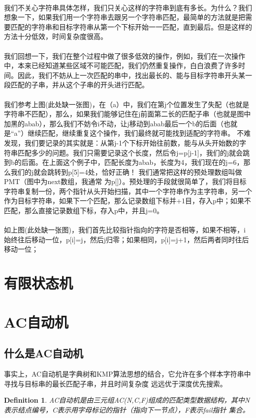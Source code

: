 \documentclass[12pt,a4paper,UTF16]{ctexbook}
\theoremstyle{plain}
\newtheorem{definition}{\indent Definition}[section]
\begin{document}
\paragraph{}我们不关心字符串具体怎样，我们只关心这样的字符串到底有多长。为什么？我们想象一下，如果我们用一个字符串去跟另一个字符串匹配，最简单的方法就是把需要匹配的字符串和目标字符串从第一个下标开始一一匹配，直到最后。但是这样的方法十分低效，时间复杂度很高。
\paragraph{}我们回想一下，我们在整个过程中做了很多低效的操作，例如，我们在一次操作中，本来已经知道某些区域不可能匹配，我们仍然重复操作，白白浪费了许多时间。因此，我们不妨从上一次匹配的串中，找出最长的、能与目标字符串开头某一段匹配的子串，并从这个子串的开头进行匹配。
\paragraph{}我们参考上图(此处缺一张图)，在（a）中，我们在第j个位置发生了失配（也就是字符串不匹配），那么，如果我们能够记住在j前面第二长的匹配子串（也就是图中加黑的abab），那么我们不妨令i不动，让j移动到abab最后一个b的后面（也就是“a”）继续匹配，继续重复这个操作，我们最终就可能找到适配的字符串。
不难发现，我们要记录的其实就是：从第j-1个下标开始往前数，能与从头开始数的字符串匹配多少的问题。我们只需要记录这个长度，然后令j=p[j-1]，我们的j就会跳到b的后面。在上面这个例子中，匹配长度为abab，长度为4，我们现在的j=6，那么我们的j就会跳转到p[5]=4处，恰好正确！
我们通常把这样的预处理数组叫做PMT（图中为next数组，我通常  为p[]）。预处理的手段就很简单了，我们将目标字符串复制一份，两个指针从头开始扫描，其中一个字符串作为主字符串，另一个作为目标字符串，如果下一个匹配，那么记录数组下标并+1目，存入p中；如果不匹配，那么直接记录数组下标，存入p中，并且j=0。
\paragraph{}
如上图(此处缺一张图)，我们首先比较指针指向的字符是否相等，如果不相等，i始终往后移动一位，p[i]=j，然后j归零；如果相同，p[i]=j+1，然后两者同时往后移动一位；
\section{有限状态机}
\section{AC自动机}
\subsection{什么是AC自动机}
事实上，AC自动机是字典树和KMP算法思想的结合，它允许在多个样本字符串中寻找与目标串的最长匹配子串，并且时间复杂度
远远优于深度优先搜索。
\begin{definition}
  AC自动机是由三元组AC(N,C,F)组成的匹配类型数据结构，其中N表示结点编号，C表示用字母标记的指针（指向下一节点），F表示fail指针
  集合。
\end{definition}
\end{document}
